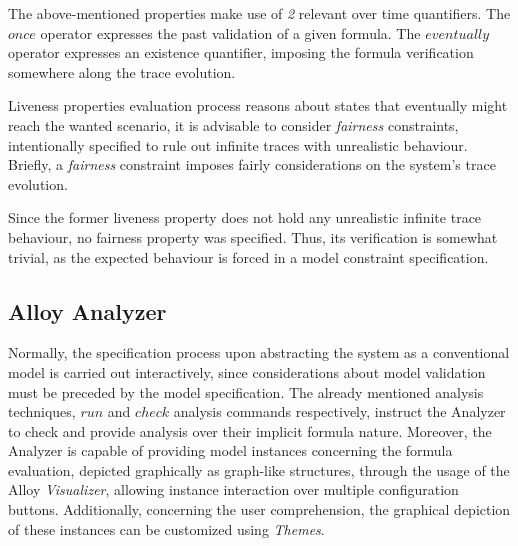 The above-mentioned properties make use of \textit{2} relevant over time quantifiers. The $once$ operator expresses the past validation of a given formula. The $eventually$ operator expresses an existence quantifier, imposing the formula verification somewhere along the trace evolution. \cite{alloy-docs} 

Liveness properties evaluation process reasons about states that eventually might reach the wanted scenario, it is advisable to consider \textit{fairness} constraints, intentionally specified to rule out infinite traces with unrealistic behaviour. \cite{baier2008principles} Briefly, a \textit{fairness} constraint imposes fairly considerations on the system's trace evolution. \cite{wahlfairness} 

Since the former liveness property does not hold any unrealistic infinite trace behaviour, no fairness property was specified. Thus, its verification is somewhat trivial, as the expected behaviour is forced in a model constraint specification.

\subsection{Alloy Analyzer}

Normally, the specification process upon abstracting the system as a conventional model is carried out interactively, since considerations about model validation must be preceded by the model specification. The already mentioned analysis techniques, $run$ and $check$ analysis commands respectively, instruct the Analyzer to check and provide analysis over their implicit formula nature. Moreover, the Analyzer is capable of providing model instances concerning the formula evaluation, depicted graphically as graph-like structures, through the usage of the Alloy \textit{Visualizer}, allowing instance interaction over multiple configuration buttons. Additionally, concerning the user comprehension, the graphical depiction of these instances can be customized using \textit{Themes}.

